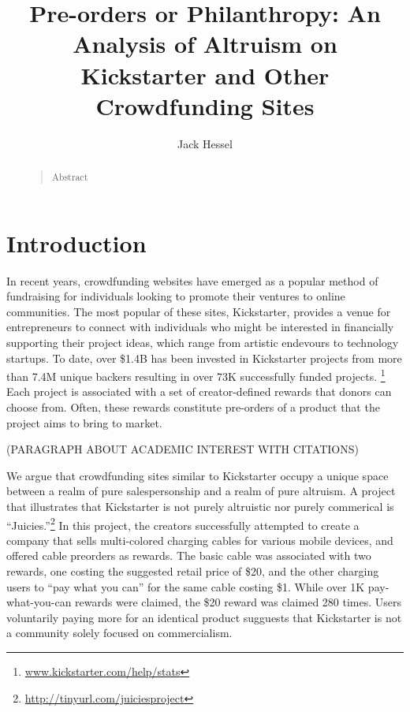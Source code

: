 \documentclass[letterpaper]{article}
\begin{document}
%
\title{Pre-orders or Philanthropy: An Analysis of Altruism on Kickstarter and Other Crowdfunding Sites}
\author{Jack Hessel}
\maketitle
\begin{abstract}
\begin{quote}
Abstract
\end{quote}
\end{abstract}

\section{Introduction}

In recent years, crowdfunding websites have emerged as a popular method of fundraising for individuals looking to promote their ventures to online communities. The most popular of these sites, Kickstarter, provides a venue for entrepreneurs to connect with individuals who might be interested in financially supporting their project ideas, which range from artistic endevours to technology startups. To date, over \$1.4B has been invested in Kickstarter projects from more than 7.4M unique backers resulting in over 73K successfully funded projects. \footnote{ \url{www.kickstarter.com/help/stats}} Each project is associated with a set of creator-defined rewards that donors can choose from. Often, these rewards constitute pre-orders of a product that the project aims to bring to market.

(PARAGRAPH ABOUT ACADEMIC INTEREST WITH CITATIONS)

We argue that crowdfunding sites similar to Kickstarter occupy a unique space between a realm of pure salespersonship and a realm of pure altruism. A project that illustrates that Kickstarter is not purely altruistic nor purely commerical is ``Juicies.''\footnote{\url{http://tinyurl.com/juiciesproject}} In this project, the creators successfully attempted to create a company that sells multi-colored charging cables for various mobile devices, and offered cable preorders as rewards. The basic cable was associated with two rewards, one costing the suggested retail price of \$20, and the other charging users to ``pay what you can'' for the same cable costing \$1. While over 1K pay-what-you-can rewards were claimed, the \$20 reward was claimed 280 times. Users voluntarily paying more for an identical product sugguests that Kickstarter is not a community solely focused on commercialism.
\end{document}
